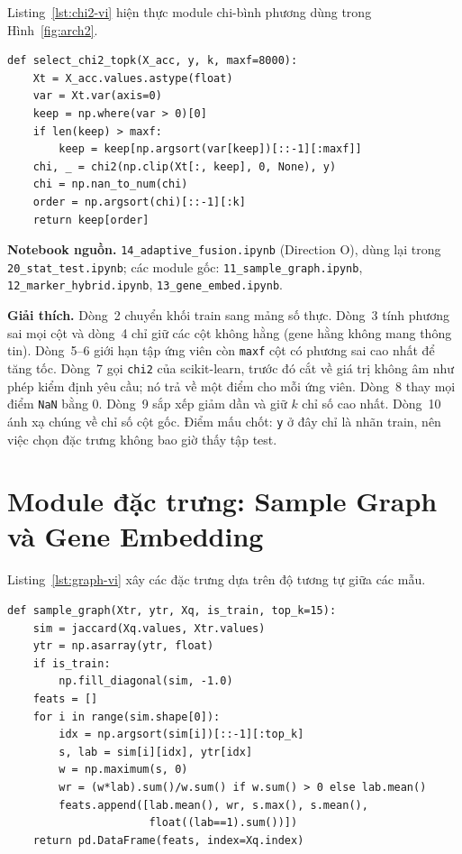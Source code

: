 \documentclass[../main.tex]{subfiles}
\begin{document}
Listing~\ref{lst:chi2-vi} hiện thực module chi-bình phương dùng trong Hình~\ref{fig:arch2}.

\begin{lstlisting}[caption={Chọn top-$k$ theo chi-bình phương (chỉ trên tập train).},label=lst:chi2-vi]
def select_chi2_topk(X_acc, y, k, maxf=8000):
    Xt = X_acc.values.astype(float)
    var = Xt.var(axis=0)
    keep = np.where(var > 0)[0]
    if len(keep) > maxf:
        keep = keep[np.argsort(var[keep])[::-1][:maxf]]
    chi, _ = chi2(np.clip(Xt[:, keep], 0, None), y)
    chi = np.nan_to_num(chi)
    order = np.argsort(chi)[::-1][:k]
    return keep[order]
\end{lstlisting}

\noindent\textbf{Notebook nguồn.} \texttt{14\_adaptive\_fusion.ipynb} (Direction O), dùng lại trong \texttt{20\_stat\_test.ipynb}; các module gốc: \texttt{11\_sample\_graph.ipynb}, \texttt{12\_marker\_hybrid.ipynb}, \texttt{13\_gene\_embed.ipynb}.

\noindent\textbf{Giải thích.} Dòng~2 chuyển khối train sang mảng số thực. Dòng~3 tính phương sai mọi cột và dòng~4 chỉ giữ các cột không hằng (gene hằng không mang thông tin). Dòng~5--6 giới hạn tập ứng viên còn \texttt{maxf} cột có phương sai cao nhất để tăng tốc. Dòng~7 gọi \texttt{chi2} của scikit-learn, trước đó cắt về giá trị không âm như phép kiểm định yêu cầu; nó trả về một điểm cho mỗi ứng viên. Dòng~8 thay mọi điểm \texttt{NaN} bằng $0$. Dòng~9 sắp xếp giảm dần và giữ $k$ chỉ số cao nhất. Dòng~10 ánh xạ chúng về chỉ số cột gốc. Điểm mấu chốt: \texttt{y} ở đây chỉ là nhãn train, nên việc chọn đặc trưng không bao giờ thấy tập test.

\section{Module đặc trưng: Sample Graph và Gene Embedding}

Listing~\ref{lst:graph-vi} xây các đặc trưng dựa trên độ tương tự giữa các mẫu.

\begin{lstlisting}[caption={Thống kê hàng xóm trên đồ thị mẫu.},label=lst:graph-vi]
def sample_graph(Xtr, ytr, Xq, is_train, top_k=15):
    sim = jaccard(Xq.values, Xtr.values)
    ytr = np.asarray(ytr, float)
    if is_train:
        np.fill_diagonal(sim, -1.0)
    feats = []
    for i in range(sim.shape[0]):
        idx = np.argsort(sim[i])[::-1][:top_k]
        s, lab = sim[i][idx], ytr[idx]
        w = np.maximum(s, 0)
        wr = (w*lab).sum()/w.sum() if w.sum() > 0 else lab.mean()
        feats.append([lab.mean(), wr, s.max(), s.mean(),
                      float((lab==1).sum())])
    return pd.DataFrame(feats, index=Xq.index)
\end{lstlisting}
\end{document}
